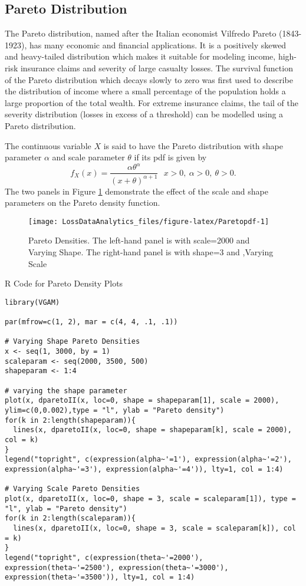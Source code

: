 \documentclass[]{book}
\theoremstyle{definition}
\theoremstyle{definition}
\theoremstyle{definition}
\theoremstyle{remark}
\begin{document}
\subsection{Pareto Distribution}\label{pareto-distribution}

The Pareto distribution, named after the Italian economist Vilfredo
Pareto (1843-1923), has many economic and financial applications. It is
a positively skewed and heavy-tailed distribution which makes it
suitable for modeling income, high-risk insurance claims and severity of
large casualty losses. The survival function of the Pareto distribution
which decays slowly to zero was first used to describe the distribution
of income where a small percentage of the population holds a large
proportion of the total wealth. For extreme insurance claims, the tail
of the severity distribution (losses in excess of a threshold) can be
modelled using a Pareto distribution.

The continuous variable \(X\) is said to have the Pareto distribution
with shape parameter \(\alpha\) and scale parameter \(\theta\) if its
pdf is given by
\[f_{X}\left( x \right) = \frac{\alpha\theta^{\alpha}}{\left( x + \theta \right)^{\alpha + 1}} \ \ \  x  >  0,\ \alpha >  0,\ \theta > 0.\]
The two panels in Figure \ref{fig:Paretopdf} demonstrate the effect of
the scale and shape parameters on the Pareto density function.

\begin{figure}

{\centering \texttt{[image: LossDataAnalytics\_files/figure-latex/Paretopdf-1]} 

}

\caption{Pareto Densities. The left-hand panel is with scale=2000 and Varying Shape.  The right-hand panel is with shape=3 and ,Varying Scale}\label{fig:Paretopdf}
\end{figure}

R Code for Pareto Density Plots

\hypertarget{display.Paretoscale.2}{}
\begin{verbatim}
library(VGAM)

par(mfrow=c(1, 2), mar = c(4, 4, .1, .1))

# Varying Shape Pareto Densities
x <- seq(1, 3000, by = 1)
scaleparam <- seq(2000, 3500, 500)
shapeparam <- 1:4

# varying the shape parameter
plot(x, dparetoII(x, loc=0, shape = shapeparam[1], scale = 2000), ylim=c(0,0.002),type = "l", ylab = "Pareto density")
for(k in 2:length(shapeparam)){
  lines(x, dparetoII(x, loc=0, shape = shapeparam[k], scale = 2000), col = k)
}
legend("topright", c(expression(alpha~'=1'), expression(alpha~'=2'), expression(alpha~'=3'), expression(alpha~'=4')), lty=1, col = 1:4)

# Varying Scale Pareto Densities
plot(x, dparetoII(x, loc=0, shape = 3, scale = scaleparam[1]), type = "l", ylab = "Pareto density")
for(k in 2:length(scaleparam)){
  lines(x, dparetoII(x, loc=0, shape = 3, scale = scaleparam[k]), col = k)
}
legend("topright", c(expression(theta~'=2000'), expression(theta~'=2500'), expression(theta~'=3000'), expression(theta~'=3500')), lty=1, col = 1:4)
\end{verbatim}
\end{document}
